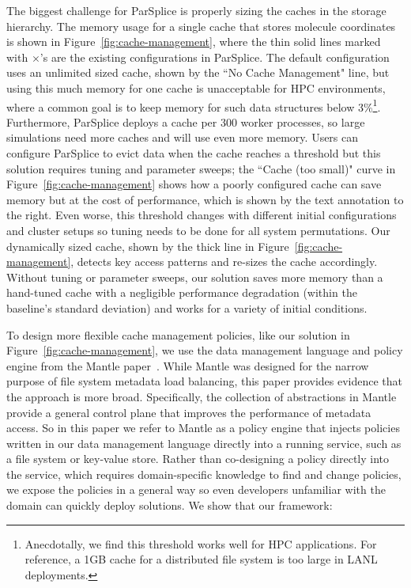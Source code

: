 The biggest challenge for ParSplice is properly sizing the caches in the
storage hierarchy.  The memory usage for a single cache that stores molecule
coordinates is shown in Figure~\ref{fig:cache-management}, where the thin solid
lines marked with \(\times\)'s are the existing configurations in ParSplice.
The default configuration uses an unlimited sized cache, shown by the ``No
Cache Management" line, but using this much memory for one cache is
unacceptable for HPC environments, where a common goal is to keep memory for
such data structures below 3\%\footnote{Anecdotally, we find this threshold
works well for HPC applications.  For reference, a 1GB cache for a distributed
file system is too large in LANL deployments.}. Furthermore, ParSplice deploys
a cache per 300 worker processes, so large simulations need more caches and
will use even more memory.  Users can configure ParSplice to evict data when
the cache reaches a threshold but this solution requires tuning and parameter
sweeps; the ``Cache (too small)" curve in Figure~\ref{fig:cache-management}
shows how a poorly configured cache can save memory but at the cost of
performance, which is shown by the text annotation to the right.  Even worse, this
threshold changes with different initial configurations and cluster setups so
tuning needs to be done for all system permutations.  Our dynamically sized
cache, shown by the thick line in Figure~\ref{fig:cache-management}, detects
key access patterns and re-sizes the cache accordingly.  Without tuning or
parameter sweeps, our solution saves more memory than a hand-tuned cache with a
negligible performance degradation (within the baseline's standard deviation)
and works for a variety of initial conditions.

To design more flexible cache management policies, like our solution in
Figure~\ref{fig:cache-management}, we use the data management language and
policy engine from the Mantle paper~\cite{sevilla:sc15-mantle}.  While Mantle
was designed for the narrow purpose of file system metadata load balancing,
this paper provides evidence that the approach is more broad.  Specifically,
the collection of abstractions in Mantle provide a general control plane that
improves the performance of metadata access. So in this paper we refer to
Mantle as a policy engine that injects policies written in our data management
language directly into a running service, such as a file system or key-value
store.  Rather than co-designing a policy directly into the service, which
requires domain-specific knowledge to find and change policies, we expose the
policies in a general way so even developers unfamiliar with the domain can
quickly deploy solutions.  We show that our framework:

